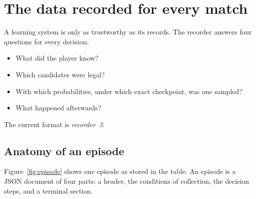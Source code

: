 \section{The data recorded for every match}
\label{sec:data}

\historyscope

A learning system is only as trustworthy as its records. The recorder
answers four questions for every decision:
\begin{itemize}
  \item What did the player know?
  \item Which candidates were legal?
  \item With which probabilities, under which exact checkpoint, was one
    sampled?
  \item What happened afterwards?
\end{itemize}
The current format is \emph{recorder~3}.

\subsection{Anatomy of an episode}
Figure~\ref{fig:episode} shows one episode as stored in the 
table. An episode is a JSON document of four parts: a header, the conditions
of collection, the decision steps, and a terminal section.

